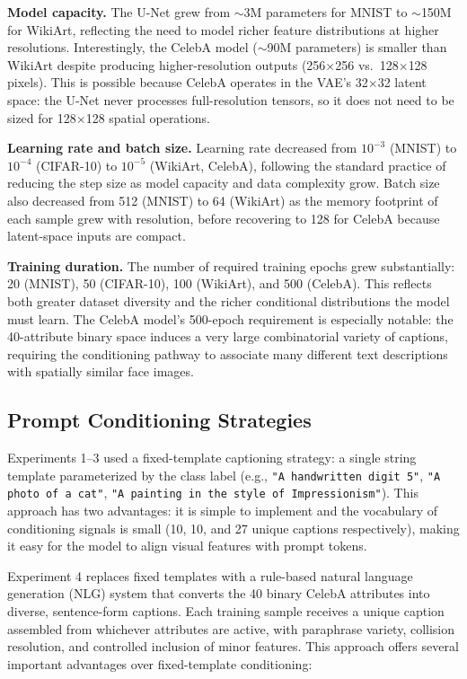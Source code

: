 \textbf{Model capacity.}
The U-Net grew from $\sim$3M parameters for MNIST to $\sim$150M for WikiArt, reflecting the need to model richer feature distributions at higher resolutions. Interestingly, the CelebA model ($\sim$90M parameters) is smaller than WikiArt despite producing higher-resolution outputs (256$\times$256 vs.\ 128$\times$128 pixels). This is possible because CelebA operates in the VAE's 32$\times$32 latent space: the U-Net never processes full-resolution tensors, so it does not need to be sized for 128$\times$128 spatial operations.

\textbf{Learning rate and batch size.}
Learning rate decreased from $10^{-3}$ (MNIST) to $10^{-4}$ (CIFAR-10) to $10^{-5}$ (WikiArt, CelebA), following the standard practice of reducing the step size as model capacity and data complexity grow. Batch size also decreased from 512 (MNIST) to 64 (WikiArt) as the memory footprint of each sample grew with resolution, before recovering to 128 for CelebA because latent-space inputs are compact.

\textbf{Training duration.}
The number of required training epochs grew substantially: 20 (MNIST), 50 (CIFAR-10), 100 (WikiArt), and 500 (CelebA). This reflects both greater dataset diversity and the richer conditional distributions the model must learn. The CelebA model's 500-epoch requirement is especially notable: the 40-attribute binary space induces a very large combinatorial variety of captions, requiring the conditioning pathway to associate many different text descriptions with spatially similar face images.

\subsection{Prompt Conditioning Strategies}

Experiments 1--3 used a fixed-template captioning strategy: a single string template parameterized by the class label (e.g., \texttt{"A handwritten digit 5"}, \texttt{"A photo of a cat"}, \texttt{"A painting in the style of Impressionism"}). This approach has two advantages: it is simple to implement and the vocabulary of conditioning signals is small (10, 10, and 27 unique captions respectively), making it easy for the model to align visual features with prompt tokens.

Experiment 4 replaces fixed templates with a rule-based natural language generation (NLG) system that converts the 40 binary CelebA attributes into diverse, sentence-form captions. Each training sample receives a unique caption assembled from whichever attributes are active, with paraphrase variety, collision resolution, and controlled inclusion of minor features. This approach offers several important advantages over fixed-template conditioning:

